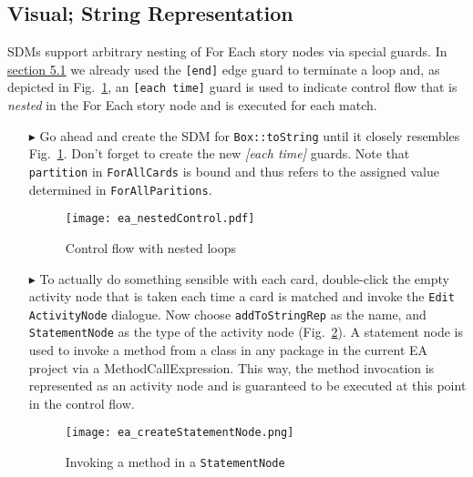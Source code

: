 \newpage
\subsection{Visual; String Representation}
\visHeader
\hypertarget{stringRep vis}{}

SDMs support arbitrary nesting of For Each story nodes via special guards. In \hyperlink{emptyPartition vis}{section 5.1} 
we already used the \texttt{[end]} edge guard to terminate a loop and, as depicted in Fig.~\ref{fig:sdm_tostring_1}, an
\texttt{[each time]} guard is used to indicate control flow that is \emph{nested} in the For Each story node and is executed for each match.

\begin{itemize}

\item[$\blacktriangleright$] Go ahead and create the SDM for \texttt{Box::toString} until it closely resembles Fig.~\ref{fig:sdm_tostring_1}. Don't forget to
create the new \emph{[each time]} guards. Note that \texttt{partition} in \texttt{ForAllCards} is bound  and thus refers to the assigned value determined in
\texttt{ForAllParitions}.

\vspace{0.5cm}

\begin{figure}[htbp]
\begin{center}
  \texttt{[image: ea\_nestedControl.pdf]}
  \caption{Control flow with nested loops} 
  \label{fig:sdm_tostring_1}
\end{center}
\end{figure}

\clearpage

\item[$\blacktriangleright$] To actually do something sensible with each card, double-click the empty activity node that is taken each time a card is matched and invoke the \texttt{Edit
ActivityNode} dialogue. Now choose \texttt{addToStringRep} as the name, and \texttt{StatementNode} as the type of the activity node
(Fig.~\ref{fig:sdm_tostring_2}).  A statement node is used to invoke a method from a class in any package in the current EA project via a
MethodCallExpression. This way, the method invocation is represented as an activity node and is guaranteed to be executed at this point in the control flow.

\begin{figure}[htbp]
\begin{center}
  \texttt{[image: ea\_createStatementNode.png]}
  \caption{Invoking a method in a \texttt{StatementNode}}  
  \label{fig:sdm_tostring_2}
\end{center}
\end{figure}


\end{itemize}

